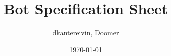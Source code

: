 \documentclass{article}
\begin{document}
    \title{Bot Specification Sheet}
    \author{dkantereivin, Doomer}
    \date{\today} %
\end{document}
